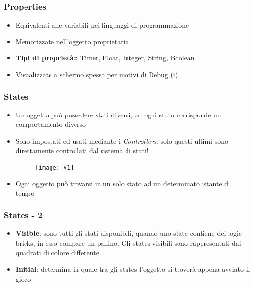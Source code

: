 \documentclass{beamer}
\def\image[#1][#2]{
	\begin{figure}[H]
		\centering
		\texttt{[image: \#1]}
\end{figure}}
\begin{document}
		\begin{frame}
			\frametitle{Properties}
			\begin{itemize}
				\item Equivalenti alle variabili nei linguaggi di programmazione
				\item Memorizzate nell’oggetto proprietario
				\item \textbf{Tipi di proprietà:}: Timer, Float, Integer, String, Boolean
				\item Visualizzate a schermo spesso per motivi di Debug (i)
			\end{itemize}
		\end{frame}	
		\begin{frame}
			\frametitle{States}
			\begin{itemize}
				\item Un oggetto può possedere stati diversi, ad ogni stato corrisponde un comportamento diverso %
				\item Sono impostati ed usati mediante i \textit{Controllers}: solo questi ultimi sono direttamente controllati dal sistema di stati! \image[images/states.png][scale=0.3]
				\item Ogni oggetto può trovarsi in un solo stato ad un determinato istante di tempo
			\end{itemize}
		\end{frame}	
		\begin{frame}
			\frametitle{States - 2}
			\begin{itemize}
				\item\textbf{Visible}: sono tutti gli stati disponibili, quando uno state contiene dei logic bricks, in esso compare un pallino. Gli states visibili sono rappresentati dai quadrati di colore differente.
				\item\textbf{Initial}: determina in quale tra gli states l'oggetto si troverà appena avviato il gioco
			\end{itemize}
		\end{frame}
\end{document}
